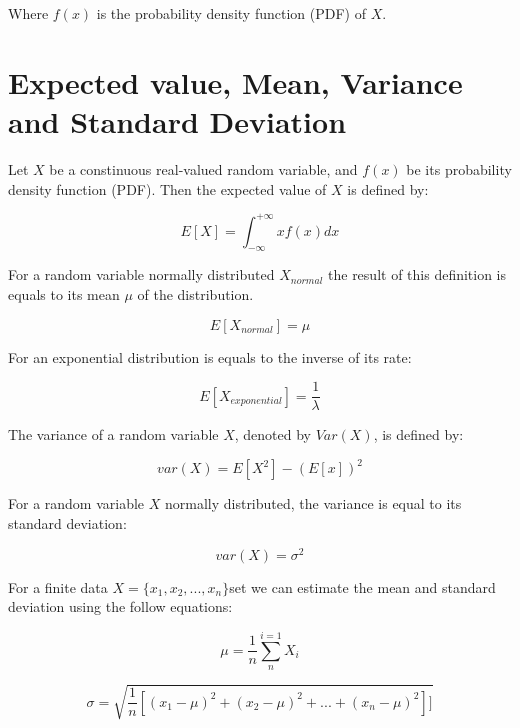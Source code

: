 Where $f(x)$ is the probability density function (PDF) of $X$.

\section{Expected value, Mean, Variance and Standard Deviation}

Let $X$ be a constinuous real-valued random variable, and $f(x)$ be its  probability density function (PDF). Then the expected value of $X$ is defined by:

\begin{equation}
E[X] =  \int_{- \infty}^{+ \infty}xf(x) dx 
\end{equation}


For a random variable normally distributed $X_{normal}$ the result of this definition is equals to its mean $\mu$ of the distribution.

\begin{equation}
E[X_{normal}] = \mu
\end{equation}

For an exponential distribution is equals to the inverse of its rate:

\begin{equation}
E[X_{exponential}] = \frac{1}{\lambda}
\end{equation}

The variance of a random variable $X$, denoted by $Var(X)$, is defined by:

\begin{equation}
var(X) =  E[X^2] - (E[x])^{2} 
\end{equation}

For a random variable $X$ normally distributed, the variance is equal to its standard deviation\cite{ross-probability}: 

\begin{equation}
var(X) = \sigma^{2}
\end{equation}

For a finite data $X = \{ x_1, x_2, ..., x_n \}$set we can estimate the mean and standard deviation using the follow equations:

\begin{equation}
\mu = \frac{1}{n}\sum_{n}^{i=1}X_i
\end{equation}

\begin{equation}
\sigma = \sqrt{\frac{1}{n}[(x_1 - \mu)^2 + (x_2 - \mu)^2 + ... + (x_n - \mu)^2]]}
\end{equation}

